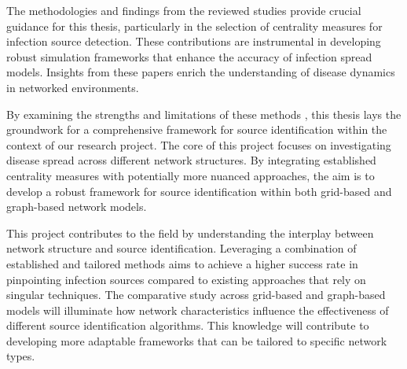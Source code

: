 The methodologies and findings from the reviewed studies provide crucial guidance for this thesis, particularly in the selection of centrality measures for infection source detection. These contributions are instrumental in developing robust simulation frameworks that enhance the accuracy of infection spread models. Insights from these papers enrich the understanding of disease dynamics in networked environments.

By examining the strengths and limitations of these methods \cite{wang2020, shelke2019, doe2018, liu2020}, this thesis lays the groundwork for a comprehensive framework for source identification within the context of our research project. The core of this project focuses on investigating disease spread across different network structures. By integrating established centrality measures with potentially more nuanced approaches, the aim is to develop a robust framework for source identification within both grid-based and graph-based network models.

This project contributes to the field by understanding the interplay between network structure and source identification. Leveraging a combination of established and tailored methods aims to achieve a higher success rate in pinpointing infection sources compared to existing approaches that rely on singular techniques. The comparative study across grid-based and graph-based models will illuminate how network characteristics influence the effectiveness of different source identification algorithms. This knowledge will contribute to developing more adaptable frameworks that can be tailored to specific network types.
